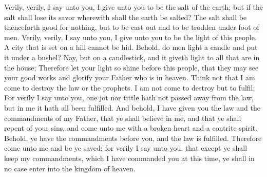 Verily, verily, I say unto you, I give unto you to be the salt of the earth; but if the salt shall lose its savor wherewith shall the earth be salted? The salt shall be thenceforth good for nothing, but to be cast out and to be trodden under foot of men.
\bverse \iffalse Verily, verily, I say unto you, I give unto you to be the light of this people. A city that is set on a hill cannot be hid. \fi
Verily, verily, I say unto you, I give unto you to be the light of this people. A city that is set on a hill cannot be hid.
\bverse \iffalse Behold, do men light a candle and put it under a bushel? Nay, but on a candlestick, and it giveth light to all that are in the house; \fi
Behold, do men light a candle and put it under a bushel? Nay, but on a candlestick, and it giveth light to all that are in the house;
\bverse \iffalse Therefore let your light so shine before this people, that they may see your good works and glorify your Father who is in heaven. \fi
Therefore let your light so shine before this people, that they may see your good works and glorify your Father who is in heaven.
\bverse \iffalse Think not that I am come to destroy the law or the prophets.  I am not come to destroy but to fulfil; \fi
Think not that I am come to destroy the law or the prophets.  I am not come to destroy but to fulfil;
\bverse \iffalse For verily I say unto you, one jot nor tittle hath not passed away from the law, but in me it hath all been fulfilled. \fi
For verily I say unto you, one jot nor tittle hath not passed away from the law, but in me it hath all been fulfilled.
\bverse \iffalse And behold, I have given you the law and the commandments of my Father, that ye shall believe in me, and that ye shall repent of your sins, and come unto me with a broken heart and a contrite spirit. Behold, ye have the commandments before you, and the law is fulfilled. \fi
And behold, I have given you the law and the commandments of my Father, that ye shall believe in me, and that ye shall repent of your sins, and come unto me with a broken heart and a contrite spirit. Behold, ye have the commandments before you, and the law is fulfilled.
\bverse \iffalse Therefore come unto me and be ye saved; for verily I say unto you, that except ye shall keep my commandments, which I have commanded you at this time, ye shall in no case enter into the kingdom of heaven. \fi
Therefore come unto me and be ye saved; for verily I say unto you, that except ye shall keep my commandments, which I have commanded you at this time, ye shall in no case enter into the kingdom of heaven.
